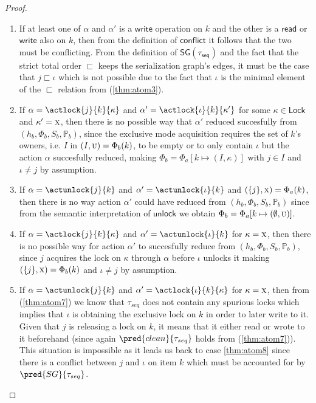 \begin{thm}
{\begin{proof}
\begin{enumerate}[label=({\roman*})]
	\item \label{thm:atom8} If at least one of $\alpha$ and $\alpha'$ is a $\mathsf{write}$ operation on $k$ and the other is a $\mathsf{read}$ or $\mathsf{write}$ also on $k$, then from the definition of $\mathsf{conflict}$ it follows that the two must be conflicting. From the definition of $\mathsf{SG(\tau_{seq})}$ and the fact that the strict total order $\sqsubset$ keeps the serialization graph's edges, it must be the case that $j \sqsubset \iota$ which is not possible due to the fact that $\iota$ is the minimal element of the $\sqsubset$ relation from (\ref{thm:atom3}).
	
	\item If $\alpha = \actlock{j}{k}{\kappa}$ and $\alpha' = \actlock{\iota}{k}{\kappa'}$ for some $\kappa \in \mathsf{Lock}$ and $\kappa' = \textsc{x}$, then there is no possible way that $\alpha'$ reduced succesfully from $(h_b, \Phi_b, S_b, \mathds{P}_b)$, since the exclusive mode acquisition requires the set of $k$'s owners, i.e. $I$ in $(I, \textsc{u}) = \Phi_b(k)$, to be empty or to only contain $\iota$ but the action $\alpha$ succesfully reduced, making $\Phi_b = \Phi_a[k \mapsto (I, \kappa)]$ with $j \in I$ and $\iota \neq j$ by assumption.
	
	\item If $\alpha = \actunlock{j}{k}$ and $\alpha' = \actunlock{\iota}{k}$ and $(\{j\}, \textsc{x}) = \Phi_a(k)$, then there is no way action $\alpha'$ could have reduced from $(h_b, \Phi_b, S_b, \mathds{P}_b)$ since from the semantic interpretation of $\mathsf{unlock}$ we obtain $\Phi_b = \Phi_a[k \mapsto (\emptyset, \textsc{u})]$.
	
	\item If $\alpha = \actlock{j}{k}{\kappa}$ and $\alpha' = \actunlock{\iota}{k}$ for $\kappa = \textsc{x}$, then there is no possible way for action $\alpha'$ to succesfully reduce from $(h_b, \Phi_b, S_b, \mathds{P}_b)$, since $j$ acquires the lock on $\kappa$ through $\alpha$ before $\iota$ unlocks it making $(\{j\}, \textsc{x}) = \Phi_b(k)$ and $\iota \neq j$ by assumption.
	
	\item If $\alpha = \actunlock{j}{k}$ and $\alpha' = \actlock{\iota}{k}{\kappa}$ for $\kappa = \textsc{x}$, then from (\ref{thm:atom7}) we know that $\tau_{seq}$ does not contain any spurious locks which implies that $\iota$ is obtaining the exclusive lock on $k$ in order to later write to it. Given that $j$ is releasing a lock on $k$, it means that it either read or wrote to it beforehand (since again $\pred{clean}{\tau_{seq}}$ holds from (\ref{thm:atom7})). This situation is impossible as it leads us back to case \ref{thm:atom8} since there is a conflict between $j$ and $\iota$ on item $k$ which must be accounted for by $\pred{SG}{\tau_{seq}}$.
	

\end{enumerate}
\end{proof}}
\end{thm}
